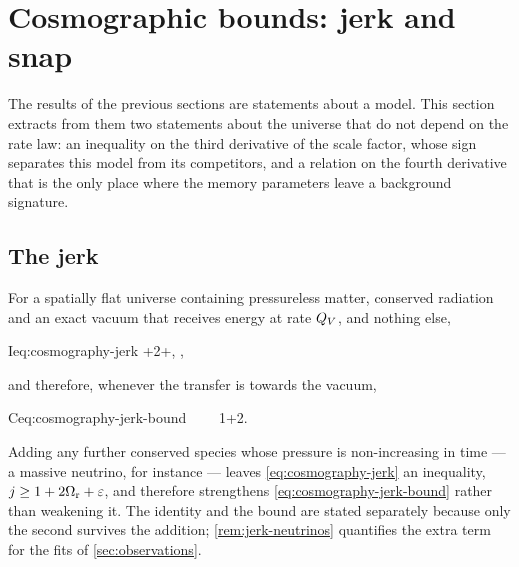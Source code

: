 \section{Cosmographic bounds: jerk and snap}\label{sec:cosmography}

The results of the previous sections are statements about a model. This section
extracts from them two statements about the universe that do not depend on the
rate law: an inequality on the third derivative of the scale factor, whose sign
separates this model from its competitors, and a relation on the fourth
derivative that is the only place where the memory parameters leave a
background signature.

\subsection{The jerk}\label{sec:cosmography-jerk}

\begin{theorem}\label{thm:jerk}
  For a spatially flat universe containing pressureless matter, conserved
  radiation and an exact vacuum that receives energy at rate $Q_{V}$, and nothing
  else,
  \begin{keyresult}{I}{eq:cosmography-jerk}
    +2\Omr+\varepsilon ,
    \qquad
    \varepsilon\eqdef{} ,
  \end{keyresult}
  and therefore, whenever the transfer is towards the vacuum,
  \begin{keyresult}{C}{eq:cosmography-jerk-bound}
    \QV{}\ \Longrightarrow\ \jerk\ \ge\ 1+2\Omr .
  \end{keyresult}
  Adding any further conserved species whose pressure is non-increasing in time
  --- a massive neutrino, for instance --- leaves \cref{eq:cosmography-jerk} an
  inequality, $j\ge1+2\Omega_{\mathrm{r}}+\varepsilon$, and therefore strengthens
  \cref{eq:cosmography-jerk-bound} rather than weakening it. The identity and
  the bound are stated separately because only the second survives the
  addition; \cref{rem:jerk-neutrinos} quantifies the extra term for the fits of
  \cref{sec:observations}.
\end{theorem}

